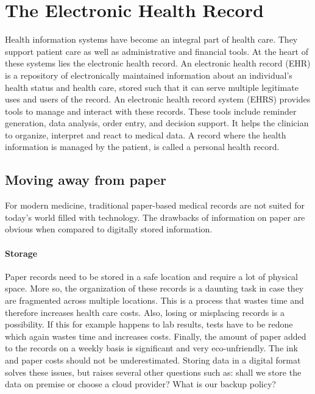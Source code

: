 \section{The Electronic Health Record}\label{background}

Health information systems have become an integral part of health care. They support patient care as well as administrative and financial tools. At the heart of these systems lies the electronic health record. An electronic health record (EHR) is a repository of electronically maintained information about an individual's health status and health care, stored such that it can serve multiple legitimate uses and users of the record\cite{Shortliffe2014}. An electronic health record system (EHRS) provides tools to manage and interact with these records. These tools include reminder generation, data analysis, order entry, and decision support. It helps the clinician to organize, interpret and react to medical data. A record where the  health information is managed by the patient, is called a personal health record\cite{Tang2006}.

    \subsection{Moving away from paper}\label{paper}

    For modern medicine, traditional paper-based medical records are not suited for today's world filled with technology. The drawbacks of information on paper are obvious when compared to digitally stored information.

    \paragraph{Storage} Paper records need to be stored in a safe location and require a lot of physical space. More so, the organization of these records is a daunting task in case they are fragmented across multiple locations. This is a process that wastes time and therefore increases health care costs. Also, losing or misplacing records is a possibility. If this for example happens to lab results, tests have to be redone which again wastes time and increases costs. Finally, the amount of paper added to the records on a weekly basis is significant and very eco-unfriendly\cite{Saleem2009}. The ink and paper costs should not be underestimated. Storing data in a digital format solves these issues, but raises several other questions such as: shall we store the data on premise or choose a cloud provider? What is our backup policy? 

